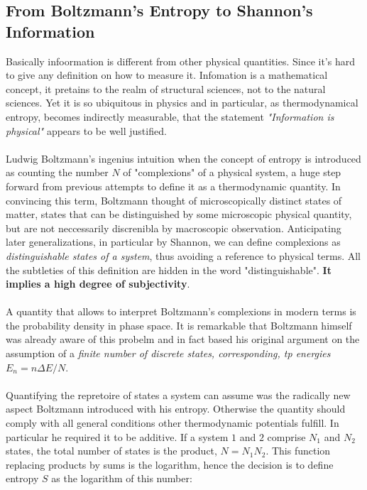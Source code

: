 \documentclass[9pt,a4paper, twocolumn]{article}
\begin{document}
        \subsection{From Boltzmann's Entropy to Shannon's Information}
            Basically infoormation is different from other physical quantities. Since it's hard to give any definition on how to measure it. Infomation is a mathematical concept, it pretains to the realm of structural sciences, not to the natural sciences. Yet it is so ubiquitous in physics and in particular, as thermodynamical entropy, becomes indirectly measurable, that the statement \textit{"Information is physical"} appears to be well justified.
            \\
            \\
            Ludwig Boltzmann's ingenius intuition when the concept of entropy is introduced as counting the number $N$ of "complexions" of a physical system, a huge step forward from previous attempts to define it as a thermodynamic quantity. In convincing this term, Boltzmann thought of microscopically distinct states of matter, states that can be distinguished by some microscopic physical quantity, but are not neccessarily discrenibla by macroscopic observation. Anticipating later generalizations, in particular by Shannon, we can define complexions as \textit{distinguishable states of a system}, thus avoiding a reference to physical terms. All the subtleties of this definition are hidden in the word "distinguishable". \textbf{It implies a high degree of subjectivity}. 
            \\
            \\
            A quantity that allows to interpret Boltzmann's complexions in modern terms is the probability density in phase space. It is remarkable that Boltzmann himself was already aware of this probelm and in fact based his original argument on the assumption of a \textit{finite number of discrete states, corresponding, tp energies $E_n = n \Delta E/N$}.
            \\
            \\
            Quantifying the repretoire of states a system can assume was the radically new aspect Boltzmann introduced with his entropy. Otherwise the quantity should comply with all general conditions other thermodynamic potentials fulfill. In particular he required it to be additive. If a system $1$ and $2$ comprise $N_1$ and $N_2$ states, the total number of states is the product, $N= N_1N_2$. This function replacing products by sums is the logarithm, hence the decision is to define entropy $S$ as the logarithm of this number:
\end{document}
